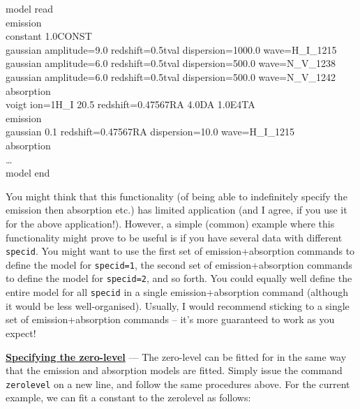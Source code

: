 \vspace{0.3cm}
\begin{mdframed}[style=MyFrame]
model read\\
emission\\
constant 1.0CONST\\
gaussian amplitude=9.0 redshift=0.5tval dispersion=1000.0 wave=H\_I\_1215\\
gaussian amplitude=6.0 redshift=0.5tval dispersion=500.0 wave=N\_V\_1238\\
gaussian amplitude=6.0 redshift=0.5tval dispersion=500.0 wave=N\_V\_1242\\
absorption\\
voigt ion=1H\_I    20.5   redshift=0.47567RA    4.0DA   1.0E4TA\\
emission\\
gaussian 0.1 redshift=0.47567RA dispersion=10.0 wave=H\_I\_1215\\
absorption\\
\ldots\\
model end
\end{mdframed}
\vspace{0.2cm}

You might think that this functionality (of being able to indefinitely specify the emission
then absorption etc.) has limited application (and I agree, if you use it for the above
application!). However, a simple (common) example where this functionality might
prove to be useful is if you have several data with different \texttt{specid}. You might
want to use the first set of emission+absorption commands to define the model for
\texttt{specid=1}, the second set of emission+absorption commands to define the
model for \texttt{specid=2}, and so forth. You could equally well define the entire
model for all \texttt{specid} in a single emission+absorption command (although
it would be less well-organised). Usually, I would recommend sticking to a single
set of emission+absorption commands -- it's more guaranteed to work as you expect!

\textbf{\underline{Specifying the zero-level}} --- The zero-level can be fitted for in
the same way that the emission and absorption models are fitted. Simply issue
the command \texttt{zerolevel} on a new line, and follow the same procedures
above. For the current example, we can fit a constant to the zerolevel as follows:

